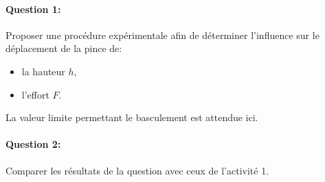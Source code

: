 \paragraph{Question 1:} Proposer une procédure expérimentale afin de déterminer l'influence sur le déplacement de la pince de:
\begin{itemize}
 \item la hauteur $h$,
 \item l'effort $F$.
\end{itemize}

La valeur limite permettant le basculement est attendue ici.

\paragraph{Question 2:} Comparer les résultats de la question avec ceux de l'activité 1.




